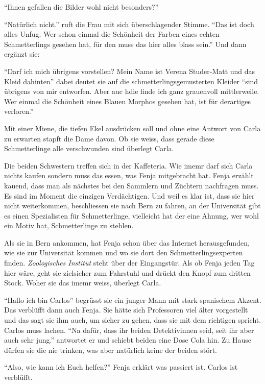 \enquote{Ihnen gefallen die Bilder wohl nicht besonders?}

\enquote{Natürlich nicht.} ruft die Frau mit sich überschlagender Stimme. \enquote{Das ist doch alles Unfug. Wer schon einmal die Schönheit der Farben eines echten Schmetterlings gesehen hat, für den muss das hier alles blass sein.} Und dann ergänzt sie:

\enquote{Darf ich mich übrigens vorstellen? Mein Name ist Verena Studer-Matt und das Kleid dahinten} dabei deutet sie auf die schmetterlingsgemusterten Kleider \enquote{sind übrigens von mir entworfen. Aber auc hdie finde ich ganz grauenvoll mittlerweile. Wer einmal die Schönheit eines Blauen Morphos gesehen hat, ist für derartiges verloren.} 

Mit einer Miene, die tiefen Ekel ausdrücken soll und ohne eine Antwort von Carla zu erwarten stapft die Dame davon. Ob sie weiss, dass gerade diese Schmetterlinge alle verschwunden sind überlegt Carla.

Die beiden Schwestern treffen sich in der Kaffeteria. Wie imemr darf sich Carla nichts kaufen sondern muss das essen, was Fenja mitgebracht hat. Fenja erzählt kauend, dass man als nächstes bei den Sammlern und Züchtern nachfragen muss. Es sind im Moment die einzigen Verdächtigen. Und weil es klar ist, dass sie hier nicht weiterkommen, beschliessen sie nach Bern zu fahren, an der Universität gibt es einen Spezialisten für Schmetterlinge, vielleicht hat der eine Ahnung, wer wohl ein Motiv hat, Schmetterlinge zu stehlen.

Als sie in Bern ankommen, hat Fenja schon über das Internet herausgefunden, wie sie zur Universität kommen und wo sie dort den Schmetterlingsexperten finden. \emph{Zoologisches Institut} steht über der Eingangstür. Als ob Fenja jeden Tag hier wäre, geht sie zielsicher zum Fahrstuhl und drückt den Knopf zum dritten Stock. Woher sie das imemr weiss, überlegt Carla.

\enquote{Hallo ich bin Carlos} begrüsst sie ein junger Mann mit stark spanischem Akzent. Das verblüfft dann auch Fenja. Sie hätte sich Professoren viel älter vorgestellt und das sagt sie ihm auch, um sicher zu gehen, dass sie mit dem richtigen spricht. Carlos muss lachen. \enquote{Na dafür, dass ihr beiden Detektivinnen seid, seit ihr aber auch sehr jung.} antwortet er und schiebt beiden eine Dose Cola hin. Zu Hause dürfen sie die nie trinken, was aber natürlich keine der beiden stört.

\enquote{Also, wie kann ich Euch helfen?} Fenja erklärt was passiert ist. Carlos ist verblüfft.

